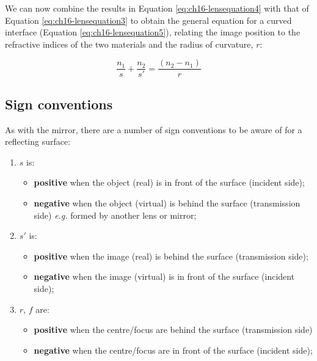 \documentclass[
]{book}
\providecommand{\tightlist}{%
  \setlength{\itemsep}{0pt}\setlength{\parskip}{0pt}}
\begin{document}
We can now combine the results in Equation \eqref{eq:ch16-lensequation4} with that of Equation \eqref{eq:ch16-lensequation3} to obtain the general equation for a curved interface (Equation \eqref{eq:ch16-lensequation5}), relating the image position to the refractive indices of the two materials and the radius of curvature, \(r\):

\begin{equation}
\frac{n_1}{s} + \frac{n_2}{s'} = \frac{(n_2 - n_1)}{r}
\label{eq:ch16-lensequation5}
\end{equation}

\hypertarget{sec-ch16-signconventioncurvedsurface1}{%
\subsection{Sign conventions}\label{sec-ch16-signconventioncurvedsurface1}}

As with the mirror, there are a number of sign conventions to be aware of for a reflecting surface:

\begin{enumerate}
\def\labelenumi{\arabic{enumi}.}
\tightlist
\item
  \(s\) is:

  \begin{itemize}
  \tightlist
  \item
    \textbf{positive} when the object (real) is in front of the surface (incident side);
  \item
    \textbf{negative} when the object (virtual) is behind the surface (transmission side) \emph{e.g.} formed by another lens or mirror;
  \end{itemize}
\item
  \(s'\) is:

  \begin{itemize}
  \tightlist
  \item
    \textbf{positive} when the image (real) is behind the surface (transmission side);
  \item
    \textbf{negative} when the image (virtual) is in front of the surface (incident side);
  \end{itemize}
\item
  \(r\), \(f\) are:

  \begin{itemize}
  \tightlist
  \item
    \textbf{positive} when the centre/focus are behind the surface (transmission side)
  \item
    \textbf{negative} when the centre/focus are in front of the surface (incident side);
  \end{itemize}
\end{enumerate}
\end{document}

